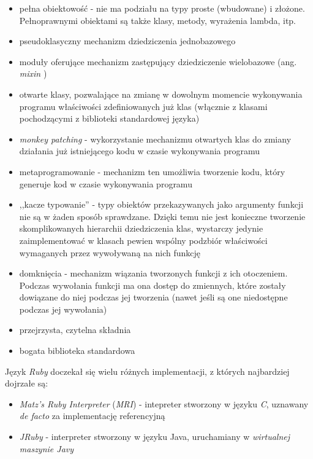 \documentclass[a4paper,12pt]{article}
\begin{document}
\begin{itemize}
\item pełna obiektowość - nie ma podziału na typy proste (wbudowane) i
  złożone. Pełnoprawnymi obiektami są także klasy, metody, wyrażenia
  lambda, itp.
\item pseudoklasyczny mechanizm dziedziczenia jednobazowego
\item moduły oferujące mechanizm zastępujący dziedziczenie wielobazowe
  (ang. \emph{mixin} \cite{mixin})
\item otwarte klasy, pozwalające na zmianę w dowolnym momencie
  wykonywania programu właściwości zdefiniowanych już klas (włącznie z
  klasami pochodzącymi z biblioteki standardowej języka)
\item \emph{monkey patching} - wykorzystanie mechanizmu otwartych klas
  do zmiany działania już istniejącego kodu w czasie wykonywania
  programu \cite{monkeypatch}
\item metaprogramowanie - mechanizm ten umożliwia tworzenie kodu,
  który generuje kod w czasie wykonywania programu
  \cite{metaprogramming}
\item ,,kacze typowanie'' - typy obiektów przekazywanych jako
  argumenty funkcji nie są w żaden sposób sprawdzane. Dzięki temu nie
  jest konieczne tworzenie skomplikowanych hierarchii dziedziczenia
  klas, wystarczy jedynie zaimplementować w klasach pewien wspólny
  podzbiór właściwości wymaganych przez wywoływaną na nich funkcję
  \cite{ducktyping}
\item domknięcia - mechanizm wiązania tworzonych funkcji z ich
  otoczeniem. Podczas wywołania funkcji ma ona dostęp do zmiennych,
  które zostały dowiązane do niej podczas jej tworzenia (nawet jeśli
  są one niedostępne podczas jej wywołania) \cite{closures}
\item przejrzysta, czytelna składnia
\item bogata biblioteka standardowa
\end{itemize}

Język \emph{Ruby} doczekał się wielu różnych implementacji, z których
najbardziej dojrzałe są:

\begin{itemize}
\item \emph{Matz's Ruby Interpreter} (\emph{MRI}) - intepreter
  stworzony w języku \emph{C}, uznawany \emph{de facto} za
  implementację referencyjną\cite{mri}
\item \emph{JRuby} - interpreter stworzony w języku Java,
  uruchamiany w \emph{wirtualnej maszynie Javy}\cite{jruby}
\end{itemize}
\end{document}
